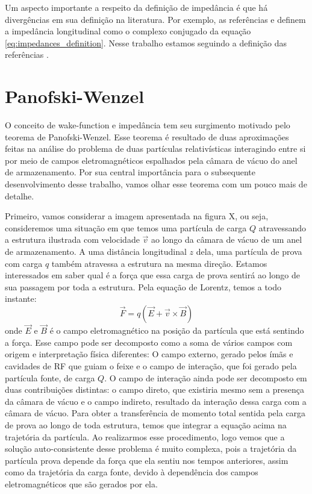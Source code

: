 Um aspecto importante a respeito da definição de impedância é que há divergências em sua definição na literatura. Por exemplo, as referências \cite{Zotter1993} e \cite{Wilson1987} definem a impedância longitudinal como o complexo conjugado da equação \eqref{eq:impedances_definition}. Nesse trabalho estamos seguindo a definição das referências \cite{CHao1993,Stupakov2000a,Heifets1991}.



\section{Panofski-Wenzel}

O conceito de wake-function e impedância tem seu surgimento motivado pelo teorema de Panofski-Wenzel. Esse teorema é resultado de duas aproximações feitas na análise do problema de duas partículas relativísticas interagindo entre si por meio de campos eletromagnéticos espalhados pela câmara de vácuo do anel de armazenamento. Por sua central importância para o subsequente desenvolvimento desse trabalho, vamos olhar esse teorema com um pouco mais de detalhe.

Primeiro, vamos considerar a imagem apresentada na figura X, ou seja, consideremos uma situação em que temos uma partícula de carga $Q$ atravessando a estrutura ilustrada com velocidade $\vec{v}$ ao longo da câmara de vácuo de um anel de armazenamento. A uma distância longitudinal $z$ dela, uma partícula de prova com carga $q$ também atravessa a estrutura na mesma direção. Estamos interessados em saber qual é a força que essa carga de prova sentirá ao longo de sua passagem por toda a estrutura. Pela equação de Lorentz, temos a todo instante:
\begin{equation}
 \vec{F} = q\left(\vec{E} + \vec{v} \times \vec{B}\right)
\end{equation}
onde $\vec{E}$ e $\vec{B}$ é o campo eletromagnético na posição da partícula que está sentindo a força. Esse campo pode ser decomposto como a soma de vários campos com origem e interpretação física diferentes: O campo externo, gerado pelos ímãs e cavidades de RF que guiam o feixe e o campo de interação, que foi gerado pela partícula fonte, de carga $Q$. O campo de interação ainda pode ser decomposto em duas contribuições distintas: o campo direto, que existiria mesmo sem a presença da câmara de vácuo e o campo indireto, resultado da interação dessa carga com a câmara de vácuo. Para obter a transferência de momento total sentida pela carga de prova ao longo de toda estrutura, temos que integrar a equação acima na trajetória da partícula. Ao realizarmos esse procedimento, logo vemos que a solução auto-consistente desse problema é muito complexa, pois a trajetória da partícula prova depende da força que ela sentiu nos tempos anteriores, assim como da trajetória da carga fonte, devido à dependência dos campos eletromagnéticos que são gerados por ela.

